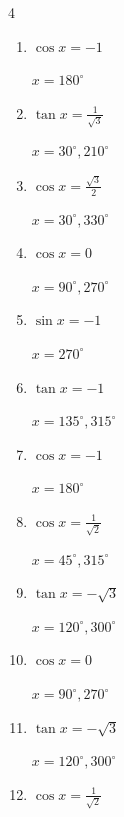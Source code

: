 \begin{multicols}{4}
\begin{enumerate}
        $\displaystyle x = 45^{\circ} , 135^{\circ}$

  \item $\displaystyle \cos{x}  = -1$

        $\displaystyle x = 180^{\circ}$

  \item $\displaystyle \tan{x}  = \frac{1}{\sqrt{3}}$

        $\displaystyle x = 30^{\circ} , 210^{\circ}$

  \item $\displaystyle \cos{x}  = \frac{\sqrt{3}}{2}$

        $\displaystyle x = 30^{\circ} , 330^{\circ}$

  \item $\displaystyle \cos{x}  = 0$

        $\displaystyle x = 90^{\circ} , 270^{\circ}$

  \item $\displaystyle \sin{x}  = -1$

        $\displaystyle x = 270^{\circ}$

  \item $\displaystyle \tan{x}  = -1$

        $\displaystyle x = 135^{\circ} , 315^{\circ}$

\columnbreak %

  \item $\displaystyle \cos{x}  = -1$

        $\displaystyle x = 180^{\circ}$

  \item $\displaystyle \cos{x}  = \frac{1}{\sqrt{2}}$

        $\displaystyle x = 45^{\circ} , 315^{\circ}$

  \item $\displaystyle \tan{x}  = -\sqrt{3}$

        $\displaystyle x = 120^{\circ} , 300^{\circ}$

  \item $\displaystyle \cos{x}  = 0$

        $\displaystyle x = 90^{\circ} , 270^{\circ}$

  \item $\displaystyle \tan{x}  = -\sqrt{3}$

        $\displaystyle x = 120^{\circ} , 300^{\circ}$

  \item $\displaystyle \cos{x}  = \frac{1}{\sqrt{2}}$


\end{enumerate}
\end{multicols}
